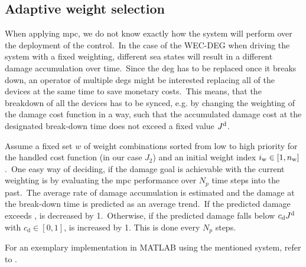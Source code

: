 \subsection{Adaptive weight selection}
When applying \ac{mpc}, we do not know exactly how the system will perform over the deployment of the control.\ 
In the case of the WEC-DEG when driving the system with a fixed weighting, different sea states will result in a different damage accumulation over time.\ 
Since the \ac{deg} has to be replaced once it breaks down, an operator of multiple \acp{deg} might be interested replacing all of the devices at the same time to save monetary costs.\ 
This means, that the breakdown of all the devices has to be synced, e.g. by changing the weighting of the damage cost function in a way, such that the accumulated damage cost at the designated break-down time \tbd does not exceed a fixed value $J^\mathrm{d}$.\ 

Assume a fixed set $w$ of \nw weight combinations sorted from low to high priority for the handled cost function (in our case $J_2$) and an initial weight index $i_\mathrm{w} \in [1, n_\mathrm{w}]$.\ 
One easy way of deciding, if the damage goal is achievable with the current weighting is by evaluating the \ac{mpc} performance over $N_p$ time steps into the past.\ 
The average rate of damage accumulation \Jps is estimated and the damage at the break-down time is predicted as an average trend.\
If the predicted damage exceeds \Jd, \iw is decreased by 1.\ 
Otherwise, if the predicted damage falls below $c_\mathrm{d}J^\mathrm{d}$ with $c_\mathrm{d}\in\left[0, 1\right]$, \iw is increased by 1.
This is done every $N_p$ steps.\
%

For an exemplary implementation in MATLAB using the mentioned system, refer to .